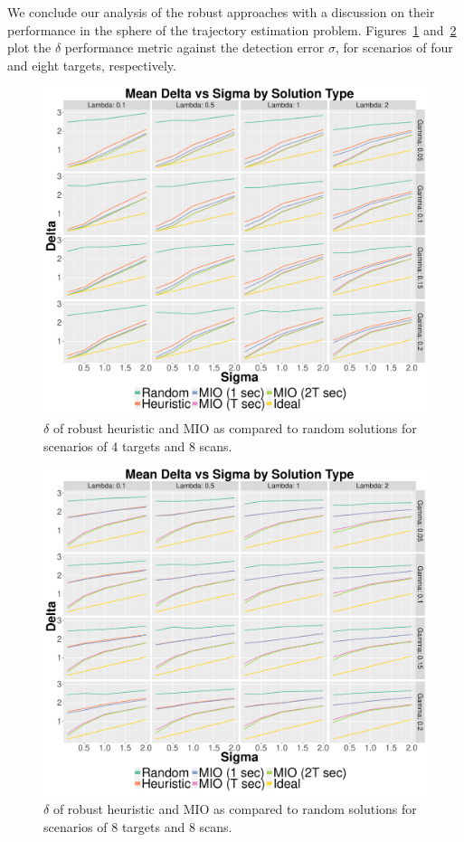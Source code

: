 We conclude our analysis of the robust approaches with a discussion on their performance in the sphere of the trajectory estimation problem. Figures~\ref{fig:Robust_4_8_Delta} and~\ref{fig:Robust_8_8_Delta} plot the $\delta$ performance metric against the detection error $\sigma$, for scenarios of four and eight targets, respectively. 
\begin{figure}[ht]
  \centering
  \includegraphics[width=\columnwidth]{../Figures/4_8_Delta}
  \caption{$\delta$ of robust heuristic and MIO as compared to random solutions for scenarios of 4 targets and 8 scans.}
  \label{fig:Robust_4_8_Delta}
\end{figure}
\begin{figure}[ht]
  \centering
  \includegraphics[width=\columnwidth]{../Figures/8_8_Delta}
  \caption{$\delta$ of robust heuristic and MIO as compared to random solutions for scenarios of 8 targets and 8 scans.}
  \label{fig:Robust_8_8_Delta}
\end{figure}

